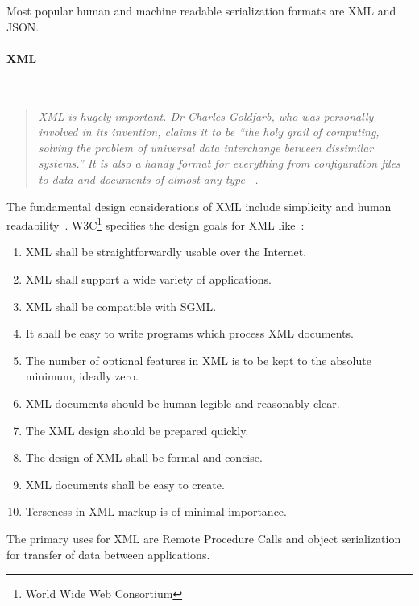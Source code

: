 Most popular human and machine readable serialization formats are XML and JSON.

\paragraph{XML} ~\\
\begin{quotation}
\textit{
XML is hugely important. Dr Charles Goldfarb, who was personally involved in its
invention, claims it to be “the holy grail of computing, solving the problem of universal data interchange between dissimilar systems.” It is also a handy format for everything from configuration files to data and documents of almost any type
~\cite{xml_intro}.}
\end{quotation} 

The fundamental design considerations of XML include
simplicity and human readability~\cite{NurseitovPRI09}.
W3C\footnote{World Wide Web Consortium} specifies the design goals for XML
like~\cite{w3c_xml}:
\begin{enumerate}
  \item XML shall be straightforwardly usable over the Internet.
  \item XML shall support a wide variety of applications.
  \item XML shall be compatible with SGML\footnotemark.
  \item It shall be easy to write programs which process XML documents.
  \item The number of optional features in XML is to be kept to the absolute minimum, ideally zero.
  \item XML documents should be human-legible and reasonably clear.
  \item The XML design should be prepared quickly.
  \item The design of XML shall be formal and concise.
  \item XML documents shall be easy to create.
  \item Terseness in XML markup is of minimal importance.  
\end{enumerate}

The primary uses for XML are Remote Procedure Calls and object serialization for transfer of
data between applications. 


